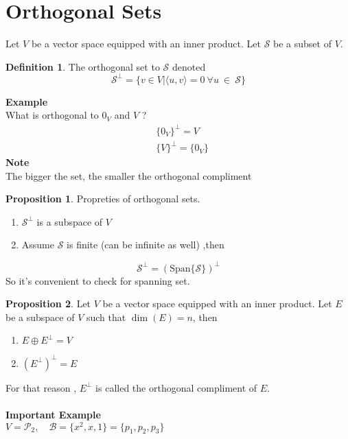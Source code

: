 \documentclass[
12pt,
]{article}
\newcommand{\la}{\langle}
\newcommand{\ra}{\rangle}
\theoremstyle{definition}
\theoremstyle{definition}
\theoremstyle{definition}
\newtheorem{Definition}{Definition}[section]
\theoremstyle{definition}
\newtheorem{Proposition}{Proposition}[section]
\begin{document}
\section{Orthogonal Sets} 
Let $V$ be a vector space equipped with an inner product. Let $\mathcal{S}$ be a subset of $V$. 
\begin{Definition}
	The orthogonal set to $\mathcal{S}$ denoted 
	\begin{equation*}
	 \mathcal{S}^{\perp} = \{v \in V |  \la  u,v\ra = 0 \ \forall u \ \in \ \mathcal{S} \}
	\end{equation*}
\end{Definition}
\textbf{Example} \\
What is orthogonal to $0_V$ and $V$ ? 
\begin{align*}
	&\{0_V\}^{\perp} = V \\
	&\{V\}^{\perp} = \{0_V\}
\end{align*}
\textbf{Note} \\
The bigger the set, the smaller the orthogonal compliment
\begin{Proposition} 
	Propreties of orthogonal sets.
	\begin{enumerate}
		\item $\mathcal{S}^{\perp} $ is a subspace of $V$ 
		\item Assume $\mathcal{S} $ is finite (can be infinite as well) ,then 
	\end{enumerate}
	\begin{equation*}
		\mathcal{S}^{\perp} = (\text{Span}\{\mathcal{S}\})^{\perp}
	\end{equation*}
	So it's convenient to check for spanning set.
\end{Proposition}
\begin{Proposition}
	Let $V$ be a vector space equipped with an inner product. Let $E$ be a subspace of $V$ such that $\dim(E) = n$, then 
	\begin{enumerate}
	\item $E \oplus E^{\perp} = V$ 
	\item $(E^{\perp})^{\perp} = E $ 
	\end{enumerate}
\end{Proposition}
For that reason , $E^{\perp}$ is called the orthogonal compliment of $E$. \\
\\
\textbf{Important Example}\\
$V = \mathcal{P}_2 ,\quad \mathcal{B} = \{x^2, x, 1\} = \{p_1, p_2, p_3\}$
\end{document}
